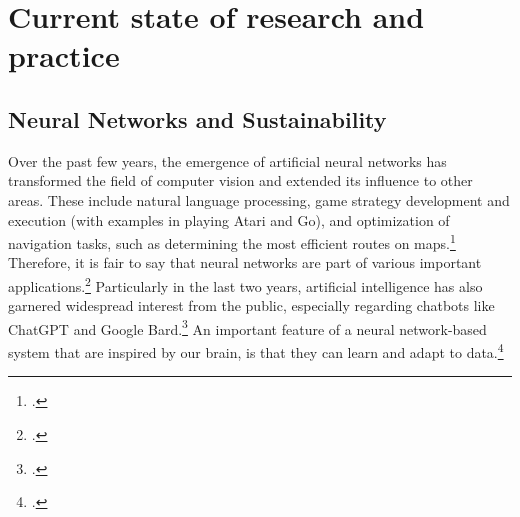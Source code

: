 \chapter{Current state of research and practice}

\section{Neural Networks and Sustainability}

Over the past few years, the emergence of artificial neural networks has transformed
the field of computer vision and extended its influence to other areas. These include natural language processing,
game strategy development and execution (with examples in playing Atari and Go),
and optimization of navigation tasks, such as determining the most efficient routes on maps.\footcite[cf.][305]{cichyDeepNeuralNetworks2019}
Therefore, it is fair to say that neural networks are part of various important applications.\footcite[cf.][1513]{gawlikowskiSurveyUncertaintyDeep2023}
Particularly in the last two years, artificial intelligence has also garnered widespread interest from the public, especially regarding chatbots like ChatGPT and Google Bard.\footcite[cf.][1-2]{singhChatGPTGoogle2023}  
An important feature of a neural network-based system that are inspired by our brain, is that they can learn and adapt to data.\footcite[cf.][305]{cichyDeepNeuralNetworks2019}

